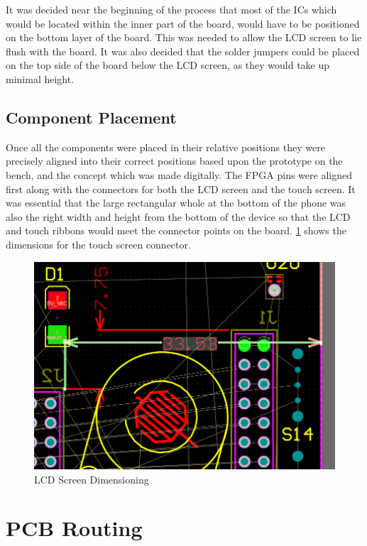 	It was decided near the beginning of the process that most of the ICs which would be located within the inner part of the board, would have to be positioned on the bottom layer of the board. This was needed to allow the LCD screen to lie flush with the board. It was also decided that the solder jumpers could be placed on the top side of the board below the LCD screen, as they would take up minimal height.\\

\subsection{Component Placement}
	Once all the components were placed in their relative positions they were precisely aligned into their correct positions based upon the prototype on the bench, and the concept which was made digitally. The FPGA pins were aligned first along with the connectors for both the LCD screen and the touch screen. It was essential that the large rectangular whole at the bottom of the phone was also the right width and height from the bottom of the device so that the LCD and touch ribbons would meet the connector points on the board. \ref{fig:component_placement} shows the dimensions for the touch screen connector. 

\begin{figure}
	\includegraphics[width=\linewidth]{Figures/component_placement.png}
	\caption{LCD Screen Dimensioning}
	\label{fig:component_placement}
\end{figure}

\section{PCB Routing}

